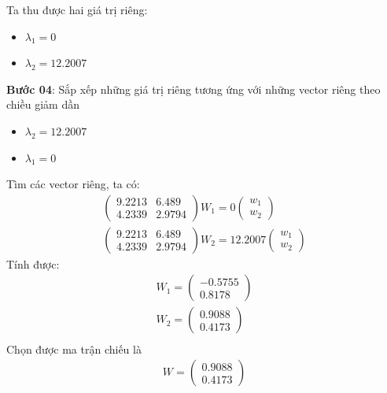 \documentclass{article}
\begin{document}
	Ta thu được hai giá trị riêng:
	\begin{itemize}
		\item $\lambda_1 = 0$
		\item $\lambda_2 = 12.2007$
	\end{itemize}
	\textbf{Bước 04}: Sắp xếp những giá trị riêng tương ứng với những vector riêng theo chiều giảm dần \newline 
	\begin{itemize}
		\item $\lambda_2 = 12.2007$
		\item $\lambda_1 = 0$
	\end{itemize}
	Tìm các vector riêng, ta có: 
	\begin{gather*}
		\begin{pmatrix}9.2213 & 6.489\\ 4.2339 & 2.9794 \end{pmatrix}W_1 = 0\begin{pmatrix}w_1 \\w_2\end{pmatrix}\\
		\begin{pmatrix}9.2213 & 6.489\\ 4.2339 & 2.9794 \end{pmatrix}W_2 = 12.2007\begin{pmatrix}w_1 \\w_2\end{pmatrix}
	\end{gather*}
	Tính được:
	\begin{gather*}
		W_1 = \begin{pmatrix}-0.5755\\0.8178\end{pmatrix}\\
		W_2 = \begin{pmatrix}0.9088\\0.4173\end{pmatrix}\\
	\end{gather*}
	Chọn được ma trận chiếu là 
	\begin{gather*}
		W = \begin{pmatrix}0.9088\\0.4173\end{pmatrix}
	\end{gather*}
\end{document}
